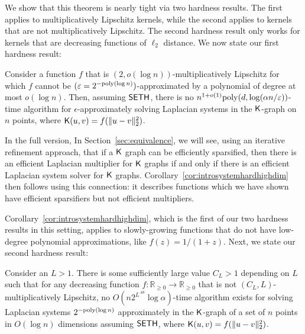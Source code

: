 We show that this theorem is nearly tight via two hardness results. The first applies to multiplicatively Lipschitz kernels, while the second applies to kernels that are not multiplicatively Lipschitz. The second hardness result only works for kernels that are decreasing functions of $\ell_2$ distance. We now state our first hardness result: 

\begin{corollary}\label{cor:introsystemhardhighdim}
Consider a function $f$ that is $(2,o(\log n))$-multiplicatively Lipschitz for which $f$ cannot be $(\varepsilon=2^{-\mathrm{poly}(\log  n)})$-approximated by a polynomial of degree at most $o(\log n)$. Then, assuming $\mathsf{SETH}$, there is no $n^{1+o(1)} \mathrm{poly}(d, \log(\alpha n/\varepsilon))$-time algorithm for $\epsilon$-approximately solving Laplacian systems in the $\mathsf{K}$-graph on $n$ points, where $\mathsf{K}(u,v) = f(\|u-v\|_2^2)$.
\end{corollary}
\ifdefined\isfocs
In the full version, 
\else
In Section~\ref{sec:equivalence},
\fi
we will see, using an iterative refinement approach, that if a $\mathsf{K}$ graph can be efficiently sparsified, then there is an efficient Laplacian multiplier for $\mathsf{K}$ graphs if and only if there is an efficient Laplacian system solver for $\mathsf{K}$ graphs. Corollary~\ref{cor:introsystemhardhighdim} then follows using this connection: it describes functions which we have shown have efficient sparsifiers but not efficient multipliers.

Corollary~\ref{cor:introsystemhardhighdim}, which is the first of our two hardness results in this setting, applies to slowly-growing functions that do not have low-degree polynomial approximations, like $f(z) = 1/(1 + z)$. Next, we state our second hardness result:

\begin{theorem}\label{thm:informal-high-lsolve-hard}
Consider an $L > 1$. There is some sufficiently large value $C_L > 1$ depending on $L$ such that for any decreasing function $f:\mathbb{R}_{\ge 0}\rightarrow \mathbb{R}_{\ge 0}$ that is not $(C_L,L)$-multiplicatively Lipschitz, no $O(n  2^{L^{.48}} \log \alpha)$-time algorithm exists for solving Laplacian systems $2^{-\mathrm{poly}(\log n)}$ approximately in the $\mathsf{K}$-graph of a set of $n$ points in $O(\log n)$ dimensions assuming $\mathsf{SETH}$, where $\mathsf{K}(u,v) = f(\|u-v\|_2^2)$. 
\end{theorem}

